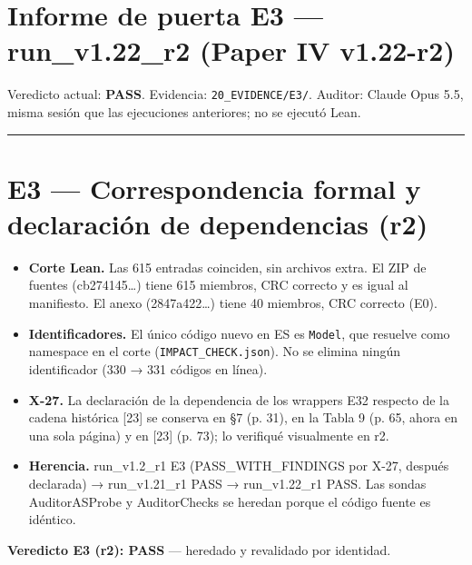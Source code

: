 \documentclass[
]{article}
\author{}
\date{}
\providecommand{\tightlist}{%
  \setlength{\itemsep}{0pt}\setlength{\parskip}{0pt}}
\begin{document}
\section{Informe de puerta E3 --- run\_v1.22\_r2 (Paper IV
v1.22-r2)}\label{informe-de-puerta-e3--run_v122_r2-paper-iv-v122-r2}

Veredicto actual: \textbf{PASS}. Evidencia: \texttt{20\_EVIDENCE/E3/}.
Auditor: Claude Opus 5.5, misma sesión que las ejecuciones anteriores;
no se ejecutó Lean.

\begin{center}\rule{0.5\linewidth}{0.5pt}\end{center}

\section{E3 --- Correspondencia formal y declaración de dependencias
(r2)}\label{e3--correspondencia-formal-y-declaraciuxf3n-de-dependencias-r2}

\begin{itemize}
\tightlist
\item
  \textbf{Corte Lean.} Las 615 entradas coinciden, sin archivos extra.
  El ZIP de fuentes (cb274145\ldots) tiene 615 miembros, CRC correcto y
  es igual al manifiesto. El anexo (2847a422\ldots) tiene 40 miembros,
  CRC correcto (E0).
\item
  \textbf{Identificadores.} El único código nuevo en ES es
  \texttt{Model}, que resuelve como namespace en el corte
  (\texttt{IMPACT\_CHECK.json}). No se elimina ningún identificador (330
  → 331 códigos en línea).
\item
  \textbf{X-27.} La declaración de la dependencia de los wrappers E32
  respecto de la cadena histórica {[}23{]} se conserva en §7 (p. 31), en
  la Tabla 9 (p. 65, ahora en una sola página) y en {[}23{]} (p. 73); lo
  verifiqué visualmente en r2.
\item
  \textbf{Herencia.} run\_v1.2\_r1 E3 (PASS\_WITH\_FINDINGS por X-27,
  después declarada) → run\_v1.21\_r1 PASS → run\_v1.22\_r1 PASS. Las
  sondas AuditorASProbe y AuditorChecks se heredan porque el código
  fuente es idéntico.
\end{itemize}

\textbf{Veredicto E3 (r2): PASS} --- heredado y revalidado por
identidad.
\end{document}
